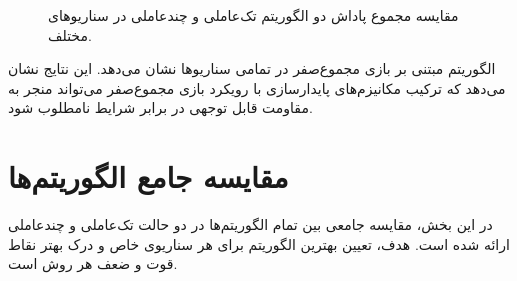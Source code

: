 \begin{figure}[H]
	
	\caption{مقایسه مجموع پاداش دو الگوریتم تک‌عاملی و چندعاملی  در سناریوهای مختلف. 
		}
	\label{fig:td3_robustness_violin}
\end{figure}

الگوریتم  مبتنی بر بازی مجموع‌صفر در تمامی سناریوها نشان می‌دهد. 
این نتایج نشان می‌دهد که ترکیب مکانیزم‌های پایدارسازی  با رویکرد بازی مجموع‌صفر می‌تواند منجر به مقاومت قابل توجهی در برابر شرایط نامطلوب شود.

\section{مقایسه جامع الگوریتم‌ها}
\label{sec:comprehensive_comparison}

در این بخش، مقایسه جامعی بین تمام الگوریتم‌ها در دو حالت تک‌عاملی و چندعاملی ارائه شده است. هدف، تعیین بهترین الگوریتم برای هر سناریوی خاص و درک بهتر نقاط قوت و ضعف هر روش است.

